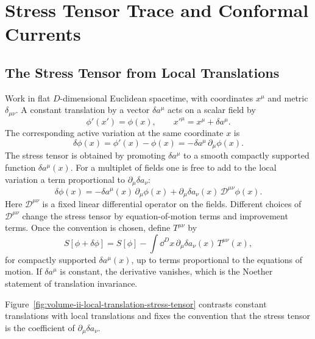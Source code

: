 \chapter{Stress Tensor Trace and Conformal Currents}
\label{ch:volume-ii-stress-tensor-trace-conformal-currents}
\ConventionsEuclidean


\section{The Stress Tensor from Local Translations}

Work in flat \(D\)-dimensional Euclidean spacetime, with coordinates \(x^\mu\)
and metric \(\delta_{\mu\nu}\).  A constant translation by a vector
\(\delta a^\mu\) acts on a scalar field by
\[
  \phi'(x')=\phi(x),
  \qquad
  x'^\mu=x^\mu+\delta a^\mu .
\]
The corresponding active variation at the same coordinate \(x\) is
\[
  \delta\phi(x)=\phi'(x)-\phi(x)
  =
  -\delta a^\mu\,\partial_\mu\phi(x).
\]
The stress tensor is obtained by promoting \(\delta a^\mu\) to a smooth
compactly supported function \(\delta a^\mu(x)\).  For a multiplet of fields
one is free to add to the local variation a term proportional to
\(\partial_\mu\delta a_\nu\):
\[
  \delta\phi(x)
  =
  -\delta a^\mu(x)\,\partial_\mu\phi(x)
  +
  \partial_\mu\delta a_\nu(x)\,\mathcal D^{\mu\nu}\phi(x).
\]
Here \(\mathcal D^{\mu\nu}\) is a fixed linear differential operator on the
fields.  Different choices of \(\mathcal D^{\mu\nu}\) change the stress tensor
by equation-of-motion terms and improvement terms.  Once the convention is
chosen, define \(T^{\mu\nu}\) by
\[
  S[\phi+\delta\phi]
  =
  S[\phi]
  -
  \int\dd^D x\,
  \partial_\mu\delta a_\nu(x)\,T^{\mu\nu}(x),
\]
for compactly supported \(\delta a^\mu(x)\), up to terms proportional to the
equations of motion.  If \(\delta a^\mu\) is constant, the derivative vanishes,
which is the Noether statement of translation invariance.

Figure~\ref{fig:volume-ii-local-translation-stress-tensor} contrasts constant
translations with local translations and fixes the convention that the stress
tensor is the coefficient of \(\partial_\mu\delta a_\nu\).

